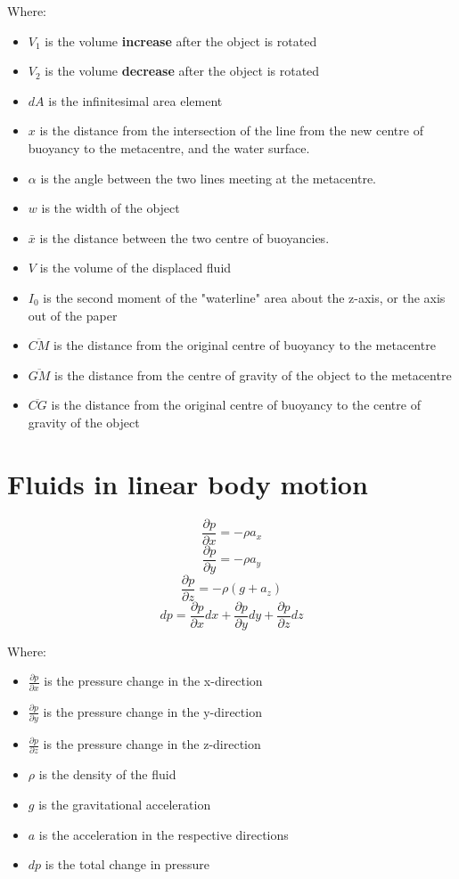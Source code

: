 \documentclass[11pt]{article}
\begin{document}
\[\]

Where:
\begin{itemize}
\item \(V_1\) is the volume \textbf{increase} after the object is rotated
\item \(V_2\) is the volume \textbf{decrease} after the object is rotated
\item \(dA\) is the infinitesimal area element
\item \(x\) is the distance from the intersection of the line from the new centre of buoyancy to the metacentre, and the water surface.
\item \(\alpha\) is the angle between the two lines meeting at the metacentre.
\item \(w\) is the width of the object
\item \(\bar{x}\) is the distance between the two centre of buoyancies.
\item \(V\) is the volume of the displaced fluid
\item \(I_0\) is the second moment of the "waterline" area about the z-axis, or the axis out of the paper
\item \(\overline{CM}\) is the distance from the original centre of buoyancy to the metacentre
\item \(\overline{GM}\) is the distance from the centre of gravity of the object to the metacentre
\item \(\overline{CG}\) is the distance from the original centre of buoyancy to the centre of gravity of the object
\end{itemize}


\section{Fluids in linear body motion}
\label{sec:orgee8b09a}
\[\frac{\partial p}{\partial x} = - \rho a_x\]
\[\frac{\partial p}{\partial y} = - \rho a_y\]
\[\frac{\partial p}{\partial z} = - \rho (g + a_z)\]
\[dp = \frac{\partial p}{\partial x} dx + \frac{\partial p}{\partial y} dy + \frac{\partial p}{\partial z} dz\]

Where:
\begin{itemize}
\item \(\frac{\partial p}{\partial x}\) is the pressure change in the x-direction
\item \(\frac{\partial p}{\partial y}\) is the pressure change in the y-direction
\item \(\frac{\partial p}{\partial z}\) is the pressure change in the z-direction
\item \(\rho\) is the density of the fluid
\item \(g\) is the gravitational acceleration
\item \(a\) is the acceleration in the respective directions
\item \(dp\) is the total change in pressure
\end{itemize}
\end{document}
